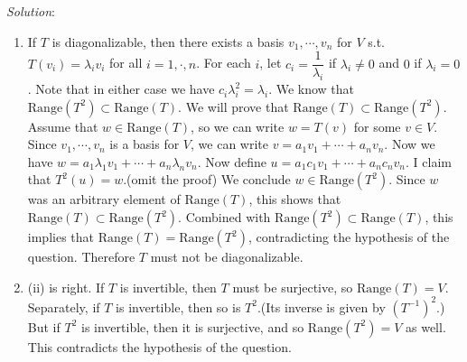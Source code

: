 \documentclass[a4paper]{article}
\begin{document}
\begin{enumerate}
		\emph{Solution}:
		\begin{enumerate}[(1)]
			\item If $T$ is diagonalizable, then there exists a basis $v_1, \cdots, v_n$ for $V$ s.t. $T(v_i) = \lambda_i v_i$ for all $i = 1, \cdot, n$. For each $i$, let $c_i = \dfrac{1}{\lambda_i}$ if $\lambda_i \not =0$ and $0$ if $\lambda_i = 0$. Note that in either case we have $c_i \lambda_i^2 = \lambda_i$. We know that $\mathrm{Range}(T^2) \subset \mathrm{Range}(T)$. We will prove that $\mathrm{Range}(T) \subset \mathrm{Range}(T^2)$. Assume that $w \in \mathrm{Range}(T)$, so we can write $w = T(v)$ for some $v \in V$. Since $v_1, \cdots, v_n$ is a basis for $V$, we can write $v = a_1 v_1 + \cdots + a_n v_n$. Now we have $w = a_1 \lambda_1 v_1+ \cdots + a_n \lambda_n v_n$. Now define $u = a_1 c_1 v_1+ \cdots + a_n c_n v_n$. I claim that $T^2(u) = w$.(omit the proof) We conclude $w \in \mathrm{Range}(T^2)$. Since $w$ was an arbitrary element of $\mathrm{Range}(T)$, this shows that $\mathrm{Range}(T) \subset \mathrm{Range}(T^2)$. Combined with $\mathrm{Range}(T^2) \subset \mathrm{Range}(T)$, this implies that $\mathrm{Range}(T) = \mathrm{Range}(T^2)$, contradicting the hypothesis of the question. Therefore $T$ must not be diagonalizable.
			\item (ii) is right. If $T$ is invertible, then $T$ must be surjective, so $\mathrm{Range}(T) =V$. Separately, if $T$ is invertible, then so is $T^2$.(Its inverse is given by $(T^{-1})^2$.) But if $T^2$ is invertible, then it is surjective, and so $\mathrm{Range}(T^2) = V$ as well. This contradicts the hypothesis of the question.
		\end{enumerate}
		
	
\end{enumerate}
\end{document}
